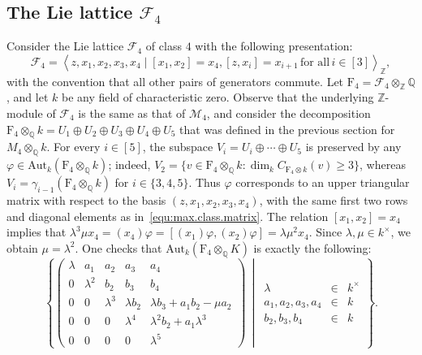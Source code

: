 \documentclass[11pt,a4paper]{amsart}
\theoremstyle{plain}
\theoremstyle{remark}
\newcommand{\Z}{\mathbb{Z}}
\newcommand{\Q}{\mathbb{Q}}
\newcommand{\tensor}{\otimes}
\begin{document}
\subsection{The Lie lattice $\mathcal{F}_4$} \label{sec:filiform}
Consider the Lie lattice $\mathcal{F}_4$ of class $4$ with the following presentation:
$$ \mathcal{F}_4 = \left\langle z, x_1, x_2, x_3, x_4 \mid [x_1, x_2] = x_4, [z, x_i] = x_{i + 1} \, \text{for all} \, i \in [3]  \right\rangle_\Z,$$
with the convention that all other pairs of generators commute.  Let $\mathrm{F}_4 = \mathcal{F}_4 \tensor_\Z \Q$, and let $k$ be any field of characteristic zero.  Observe that the underlying $\Z$-module of $\mathcal{F}_4$ is the same as that of $\mathcal{M}_4$, and consider the decomposition $\mathrm{F}_4 \tensor_\Q k = U_1 \oplus U_2 \oplus U_3 \oplus U_4 \oplus U_5$ that was defined in the previous section for $M_{4} \tensor_\Q k$.  For every $i \in [5]$, the subspace $V_i = U_i \oplus \cdots \oplus U_5$ is preserved by any $\varphi \in \mathrm{Aut}_k (\mathrm{F}_4 \tensor_\Q k)$; indeed, $V_2 = \{ v \in \mathrm{F}_4 \tensor_\Q k : \dim_k C_{\mathrm{F}_4 \tensor k}(v) \geq 3 \}$, whereas $V_i = \gamma_{i-1} (\mathrm{F_4} \tensor_\Q k)$ for $i \in \{ 3,4,5 \}$.  Thus $\varphi$ corresponds to an upper triangular matrix with respect to the basis $(z, x_1, x_2, x_3, x_4)$, with the same first two rows and diagonal elements as in~\eqref{equ:max.class.matrix}.  The relation $[x_1, x_2] = x_4$ implies that $\lambda^3 \mu x_4 =  (x_4)\varphi = [(x_1)\varphi, (x_2)\varphi] = \lambda \mu^2 x_4$.  Since $\lambda, \mu \in k^\times$, we obtain $\mu = \lambda^2$.  One checks that $\mathrm{Aut}_k (\mathrm{F}_4 \tensor_\Q K)$ is exactly the following:
\begin{equation} \label{equ:filiform.aut}
\left\{
\left( \begin{array}{ccccl}
\lambda & a_1 & a_2 & a_3 & a_4 \\
0 & \lambda^2 & b_2 & b_3 & b_4 \\
0 & 0 & \lambda^3 & \lambda b_2 & \lambda b_3 + a_1 b_2 - \mu a_2 \\
0 & 0 & 0 & \lambda^4 & \lambda^2 b_2 + a_1 \lambda^3 \\
0 & 0 & 0 & 0 & \lambda^5
\end{array} \right) \, \middle| \,
\begin{array}{rrl}
\lambda & \in & k^\times \\ a_1, a_2, a_3, a_4 & \in & k \\ b_2, b_3, b_4 & \in & k \end{array} \right\} .
\end{equation}
\end{document}
